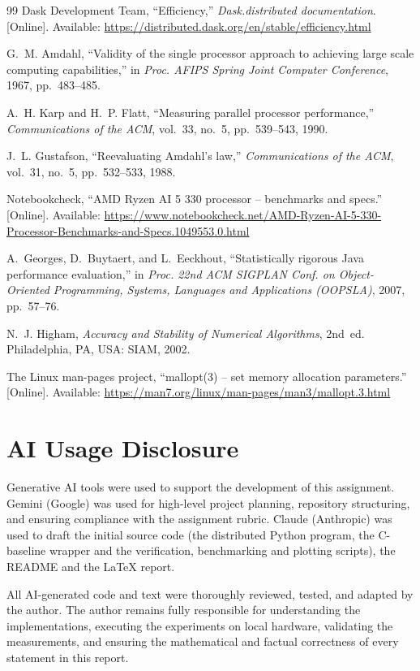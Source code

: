 \documentclass[conference,a4paper]{IEEEtran}
\begin{document}
\begin{thebibliography}{99}
Dask Development Team, ``Efficiency,'' \emph{Dask.distributed documentation}.
[Online]. Available: \url{https://distributed.dask.org/en/stable/efficiency.html}

G.~M. Amdahl, ``Validity of the single processor approach to achieving large
scale computing capabilities,'' in \emph{Proc. AFIPS Spring Joint Computer
Conference}, 1967, pp.~483--485.

A.~H. Karp and H.~P. Flatt, ``Measuring parallel processor performance,''
\emph{Communications of the ACM}, vol.~33, no.~5, pp.~539--543, 1990.

J.~L. Gustafson, ``Reevaluating Amdahl's law,'' \emph{Communications of the
ACM}, vol.~31, no.~5, pp.~532--533, 1988.

Notebookcheck, ``AMD Ryzen AI 5 330 processor -- benchmarks and specs.''
[Online]. Available:
\url{https://www.notebookcheck.net/AMD-Ryzen-AI-5-330-Processor-Benchmarks-and-Specs.1049553.0.html}

A.~Georges, D.~Buytaert, and L.~Eeckhout, ``Statistically rigorous Java
performance evaluation,'' in \emph{Proc. 22nd ACM SIGPLAN Conf. on
Object-Oriented Programming, Systems, Languages and Applications (OOPSLA)},
2007, pp.~57--76.

N.~J. Higham, \emph{Accuracy and Stability of Numerical Algorithms}, 2nd~ed.
Philadelphia, PA, USA: SIAM, 2002.

The Linux man-pages project, ``mallopt(3) -- set memory allocation
parameters.'' [Online]. Available:
\url{https://man7.org/linux/man-pages/man3/mallopt.3.html}

\end{thebibliography}
\endgroup

\balance
\section*{AI Usage Disclosure}
Generative AI tools were used to support the development of this assignment.
Gemini (Google) was used for high-level project planning, repository
structuring, and ensuring compliance with the assignment rubric. Claude
(Anthropic) was used to draft the initial source code (the distributed Python
program, the C-baseline wrapper and the verification, benchmarking and plotting
scripts), the README and the LaTeX report.

All AI-generated code and text were thoroughly reviewed, tested, and adapted by
the author. The author remains fully responsible for understanding the
implementations, executing the experiments on local hardware, validating the
measurements, and ensuring the mathematical and factual correctness of every
statement in this report.
\end{document}
